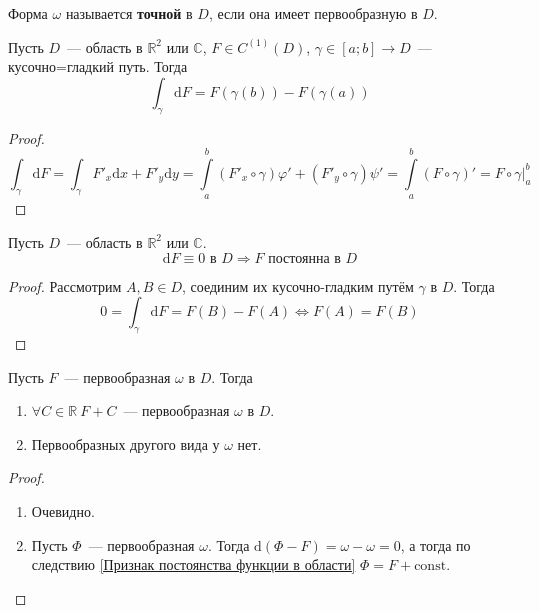 \documentclass{article}
\begin{document}
    \begin{definition}
        Форма $\omega$ называется \textbf{точной} в $D$, если она имеет первообразную в $D$.
    \end{definition}
    \begin{theorem}
        \label{Формула НЛ для криволинейных интегралов}
        Пусть $D$~--- область в $\mathbb R^2$ или $\mathbb C$, $F\in C^{(1)}(D)$, $\gamma\in[a;b]\to D$~--- кусочно=гладкий путь. Тогда
        $$
        \int_\gamma\mathrm dF=F(\gamma(b))-F(\gamma(a))
        $$
    \end{theorem}
    \begin{proof}
        $$
        \int_\gamma\mathrm dF=\int_\gamma F'_x\mathrm dx+F'_y\mathrm dy=\int\limits_a^b(F'_x\circ\gamma)\varphi'+(F'_y\circ\gamma)\psi'=\int\limits_a^b(F\circ\gamma)'=F\circ\gamma\bigg|_a^b
        $$
    \end{proof}
    \begin{corollary}
        \label{Признак постоянства функции в области}
        Пусть $D$~--- область в $\mathbb R^2$ или $\mathbb C$.
        $$
        \mathrm dF\equiv 0\text{ в }D\Rightarrow F\text{ постоянна в }D
        $$
    \end{corollary}
    \begin{proof}
        Рассмотрим $A,B\in D$, соединим их кусочно-гладким путём $\gamma$ в $D$. Тогда
        $$0=\int_\gamma\mathrm dF=F(B)-F(A)\Leftrightarrow F(A)=F(B)$$
    \end{proof}
    \begin{corollary}
        Пусть $F$~--- первообразная $\omega$ в $D$. Тогда
        \begin{enumerate}
            \item $\forall C\in\mathbb R~F+C$~--- первообразная $\omega$ в $D$.
            \item Первообразных другого вида у $\omega$ нет.
        \end{enumerate}
    \end{corollary}
    \begin{proof}
        \begin{enumerate}
            \item Очевидно.
            \item Пусть $\Phi$~--- первообразная $\omega$. Тогда $\mathrm d(\Phi-F)=\omega-\omega=0$, а тогда по следствию \ref{Признак постоянства функции в области} $\Phi=F+\mathrm{const}$.
        \end{enumerate}
    \end{proof}
\end{document}
